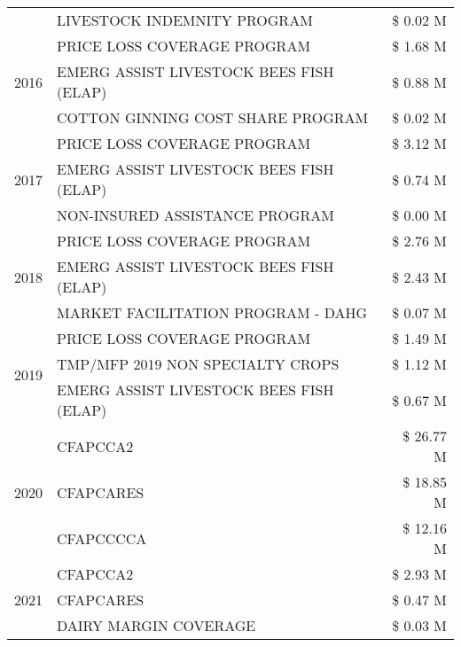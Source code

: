 \begin{tabular}{llr}
 & LIVESTOCK INDEMNITY PROGRAM & \$ 0.02 M \\
\cline{1-3}
\multirow[t]{3}{*}{2016} & PRICE LOSS COVERAGE PROGRAM                   & \$ 1.68 M \\
 & EMERG ASSIST LIVESTOCK BEES FISH (ELAP)       & \$ 0.88 M \\
 & COTTON GINNING COST SHARE PROGRAM             & \$ 0.02 M \\
\cline{1-3}
\multirow[t]{3}{*}{2017} & PRICE LOSS COVERAGE PROGRAM & \$ 3.12 M \\
 & EMERG ASSIST LIVESTOCK BEES FISH (ELAP) & \$ 0.74 M \\
 & NON-INSURED ASSISTANCE PROGRAM & \$ 0.00 M \\
\cline{1-3}
\multirow[t]{3}{*}{2018} & PRICE LOSS COVERAGE PROGRAM & \$ 2.76 M \\
 & EMERG ASSIST LIVESTOCK BEES FISH (ELAP) & \$ 2.43 M \\
 & MARKET FACILITATION PROGRAM - DAHG & \$ 0.07 M \\
\cline{1-3}
\multirow[t]{3}{*}{2019} & PRICE LOSS COVERAGE PROGRAM & \$ 1.49 M \\
 & TMP/MFP 2019 NON SPECIALTY CROPS & \$ 1.12 M \\
 & EMERG ASSIST LIVESTOCK BEES FISH (ELAP) & \$ 0.67 M \\
\cline{1-3}
\multirow[t]{3}{*}{2020} & CFAPCCA2 & \$ 26.77 M \\
 & CFAPCARES & \$ 18.85 M \\
 & CFAPCCCCA & \$ 12.16 M \\
\cline{1-3}
\multirow[t]{3}{*}{2021} & CFAPCCA2 & \$ 2.93 M \\
 & CFAPCARES & \$ 0.47 M \\
 & DAIRY MARGIN COVERAGE & \$ 0.03 M \\
\cline{1-3}
\bottomrule
\end{tabular}
